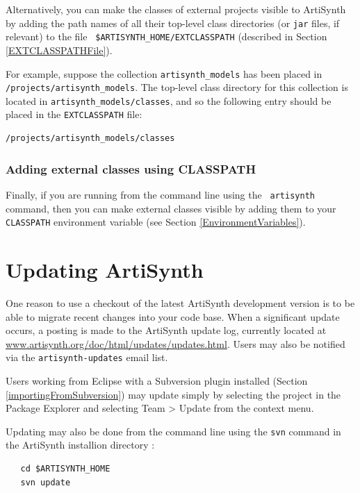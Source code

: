 \documentclass{article}
\def\SEP{/}
\def\TOP{/}
\def\directory{directory }
\def\directories{directories }
\begin{document}
Alternatively, you can make the classes of external projects visible
to ArtiSynth by adding the path names of all their top-level class
\directories (or {\tt jar} files, if relevant) to the file {\tt
\$ARTISYNTH\_HOME\SEP EXTCLASSPATH} (described in Section
\ref{EXTCLASSPATHFile}).

For example, suppose the collection {\tt artisynth\_models}
has been placed in {\tt \TOP projects\SEP artisynth\_models}.
The top-level class \directory for this collection is located
in {\tt artisynth\_models\SEP classes}, and so the following entry
should be placed in the {\tt EXTCLASSPATH} file:

\begin{verbatim}
/projects/artisynth_models/classes
\end{verbatim}

\subsubsection{Adding external classes using CLASSPATH}

Finally, if you are running from the command line using the {\tt
artisynth} command, then you can make external classes visible by adding
them to your {\tt CLASSPATH} environment variable (see Section
\ref{EnvironmentVariables}).

\section{Updating ArtiSynth}
\label{UpdatingArtiSynth}

One reason to use a checkout of the latest ArtiSynth
development version is to be able to migrate recent changes into your
code base. When a significant update occurs, a posting is made to the
ArtiSynth update log, currently located at
\href{http://www.artisynth.org/doc/html/updates/updates.html}
{www.artisynth.org/doc/html/updates/updates.html}.
Users may also be notified via the {\tt artisynth-updates} email list.

Users working from Eclipse with a Subversion plugin installed
(Section \ref{importingFromSubversion}) may update simply by selecting
the project in the {\sf Package Explorer} and selecting {\sf Team >
Update} from the context menu.

Updating may also be done from the command line using the {\tt svn}
command in the ArtiSynth installion \directory:
\begin{verbatim}
   cd $ARTISYNTH_HOME
   svn update 
\end{verbatim}
\end{document}
